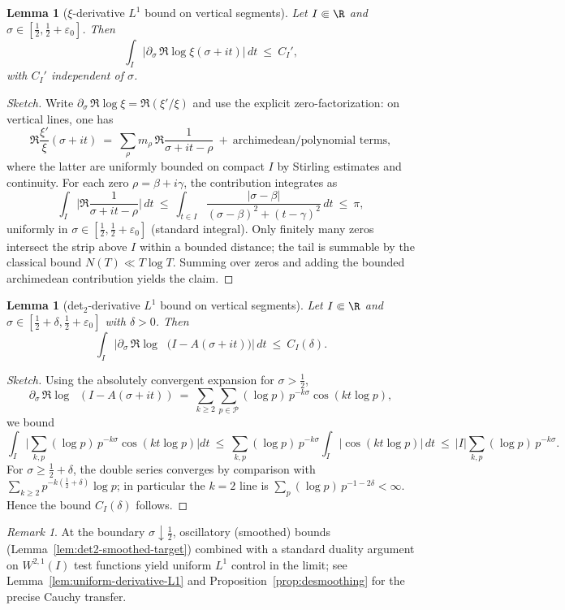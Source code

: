 \documentclass[11pt]{article}
\newtheorem{lemma}[theorem]{Lemma}
\theoremstyle{remark}
\newtheorem{remark}[theorem]{Remark}
\newcommand{\PP}{\mathcal{P}}
\DeclareMathOperator{\dettwo}{det_2}
\begin{document}
\begin{lemma}[\(\xi\)-derivative $L^1$ bound on vertical segments]\label{lem:xi-deriv-L1}
Let $I\Subset\R$ and $\sigma\in[\tfrac12,\tfrac12+\varepsilon_0]$. Then
\[
 \int_I \Big|\partial_\sigma\,\Re\log\xi(\sigma+it)\Big|\,dt\ \le\ C_I',
\]
with $C_I'$ independent of $\sigma$.
\end{lemma}
\begin{proof}[Sketch]
Write \(\partial_\sigma\,\Re\log\xi=\Re(\xi'/\xi)\) and use the explicit zero-factorization: on vertical lines, one has
\[
 \Re\frac{\xi'}{\xi}(\sigma+it)\ =\ \sum_{\rho} m_\rho\,\Re\frac{1}{\sigma+it-\rho}\ +\ \text{archimedean/polynomial terms},
\]
where the latter are uniformly bounded on compact $I$ by Stirling estimates and continuity. For each zero \(\rho=\beta+i\gamma\), the contribution integrates as
\[\int_I \Big|\Re\frac{1}{\sigma+it-\rho}\Big|\,dt\ \le\ \int_{t\in I} \frac{|\sigma-\beta|}{(\sigma-\beta)^2+(t-\gamma)^2}\,dt\ \le\ \pi,
\]
uniformly in \(\sigma\in[\tfrac12,\tfrac12+\varepsilon_0]\) (standard integral). Only finitely many zeros intersect the strip above $I$ within a bounded distance; the tail is summable by the classical bound $N(T)\ll T\log T$. Summing over zeros and adding the bounded archimedean contribution yields the claim.
\end{proof}
\begin{lemma}[det$_2$-derivative $L^1$ bound on vertical segments]\label{lem:det2-deriv-L1}
Let $I\Subset\R$ and $\sigma\in[\tfrac12+\delta,\tfrac12+\varepsilon_0]$ with $\delta>0$. Then
\[
 \int_I \Big|\partial_\sigma\,\Re\log\dettwo\big(I-A(\sigma+it)\big)\Big|\,dt\ \le\ C_I(\delta).
\]
\end{lemma}
\begin{proof}[Sketch]
Using the absolutely convergent expansion for \(\sigma>\tfrac12\),
\[\partial_\sigma\,\Re\log\dettwo(I-A(\sigma+it))\ =\ \sum_{k\ge 2}\sum_{p\in\PP} (\log p)\,p^{-k\sigma}\cos(k t\log p),\]
we bound
\[\int_I \Big|\sum_{k,p}(\log p)\,p^{-k\sigma}\cos(k t\log p)\Big|dt\ \le\ \sum_{k,p}(\log p)\,p^{-k\sigma}\int_I |\cos(k t\log p)|\,dt\ \le\ |I|\sum_{k,p}(\log p)\,p^{-k\sigma}.
\]
For \(\sigma\ge \tfrac12+\delta\), the double series converges by comparison with \(\sum_{k\ge 2} p^{-k(\tfrac12+\delta)}\log p\); in particular the $k=2$ line is \(\sum_p (\log p)\,p^{-1-2\delta}<\infty\). Hence the bound $C_I(\delta)$ follows.
\end{proof}

\begin{remark}
At the boundary \(\sigma\downarrow \tfrac12\), oscillatory (smoothed) bounds (Lemma~\ref{lem:det2-smoothed-target}) combined with a standard duality argument on \(W^{2,1}(I)\) test functions yield uniform \(L^1\) control in the limit; see Lemma~\ref{lem:uniform-derivative-L1} and Proposition~\ref{prop:desmoothing} for the precise Cauchy transfer.
\end{remark}
\end{document}

